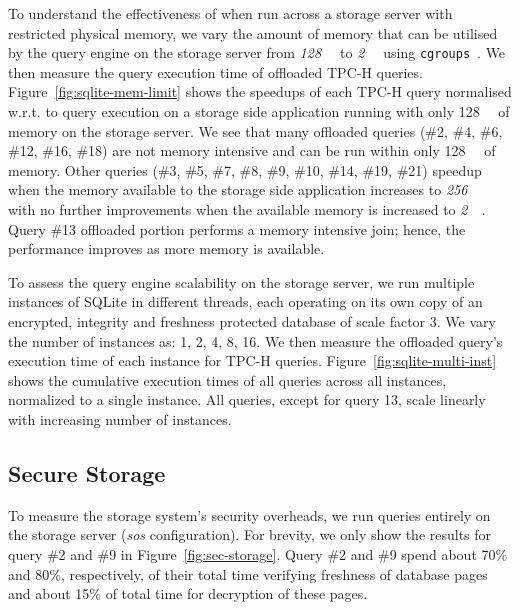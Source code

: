   
  To understand the effectiveness of \project{} when run across a storage server with restricted physical memory, we vary the amount of memory that can be utilised by the query engine on the storage server from \emph{\SI{128}{\mebi\byte}} to \emph{\SI{2}{\gibi\byte}} using {\tt cgroups}~\cite{cgroups}. We then measure the query execution time of offloaded TPC-H queries.
 Figure~\ref{fig:sqlite-mem-limit} shows the speedups of each TPC-H query normalised w.r.t. to query execution on a storage side application running with only \SI{128}{\mebi\byte} of memory on the storage server. We see that many offloaded queries (\#2, \#4, \#6, \#12, \#16, \#18) are not memory intensive and can be run within only \SI{128}{\mebi\byte} of memory. Other queries (\#3, \#5, \#7, \#8, \#9, \#10, \#14, \#19, \#21) speedup when the memory available to the storage side application increases to \emph{\SI{256}{\mebi\byte}} with no further improvements when the available memory is increased to \emph{\SI{2}{\gibi\byte}}. Query \#13 offloaded portion performs a memory intensive join; hence, the performance improves as more memory is available.
  
 
  To assess the query engine scalability on the storage server, we run multiple instances of SQLite in different threads, each operating on its own copy of an encrypted, integrity and freshness protected database of scale factor 3. We vary the number of instances as: 1, 2, 4, 8, 16. We then measure the offloaded query's execution time of each instance for TPC-H queries.
 Figure~\ref{fig:sqlite-multi-inst} shows the cumulative execution times of all queries across all instances, normalized to a single instance. All queries, except for query 13, scale linearly with increasing number of instances.

\subsection{Secure Storage}
\label{subsec:storage-eval}
To measure the storage system's security overheads, we run queries entirely on the storage server (\emph{sos} configuration). %
For brevity, we only show the results for query \#2 and \#9 in 
Figure~\ref{fig:sec-storage}. 
Query \#2 and \#9 spend about 70$\%$ and 80$\%$, respectively, of their total time verifying freshness of database pages and about 15$\%$ of total time for decryption of these pages.

